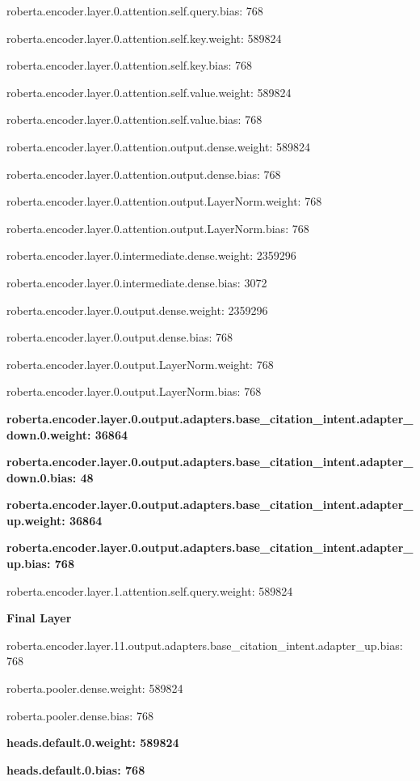 \documentclass[draft,10pt,twocolumn,letterpaper]{article}
\begin{document}
roberta.encoder.layer.0.attention.self.query.bias: 768

roberta.encoder.layer.0.attention.self.key.weight: 589824

roberta.encoder.layer.0.attention.self.key.bias: 768

roberta.encoder.layer.0.attention.self.value.weight: 589824

roberta.encoder.layer.0.attention.self.value.bias: 768

roberta.encoder.layer.0.attention.output.dense.weight: 589824

roberta.encoder.layer.0.attention.output.dense.bias: 768

roberta.encoder.layer.0.attention.output.LayerNorm.weight: 768

roberta.encoder.layer.0.attention.output.LayerNorm.bias: 768

roberta.encoder.layer.0.intermediate.dense.weight: 2359296

roberta.encoder.layer.0.intermediate.dense.bias: 3072

roberta.encoder.layer.0.output.dense.weight: 2359296

roberta.encoder.layer.0.output.dense.bias: 768

roberta.encoder.layer.0.output.LayerNorm.weight: 768

roberta.encoder.layer.0.output.LayerNorm.bias: 768

\textbf{roberta.encoder.layer.0.output.adapters.base\_citation\_intent.adapter\_down.0.weight: 36864}

\textbf{roberta.encoder.layer.0.output.adapters.base\_citation\_intent.adapter\_down.0.bias: 48}

\textbf{roberta.encoder.layer.0.output.adapters.base\_citation\_intent.adapter\_up.weight: 36864}

\textbf{roberta.encoder.layer.0.output.adapters.base\_citation\_intent.adapter\_up.bias: 768}

roberta.encoder.layer.1.attention.self.query.weight: 589824

\textbf{Final Layer}

roberta.encoder.layer.11.output.adapters.base\_citation\_intent.adapter\_up.bias: 768

roberta.pooler.dense.weight: 589824

roberta.pooler.dense.bias: 768

\textbf{heads.default.0.weight: 589824}

\textbf{heads.default.0.bias: 768}
\end{document}
